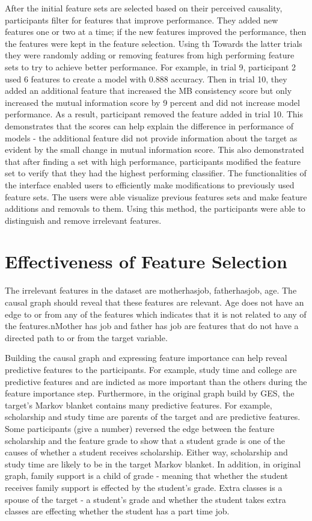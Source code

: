 After the initial feature sets are selected based on their perceived causality, participants filter for features that improve performance. They added new features one or two at a time; if the new features improved the performance, then the features were kept in the feature selection. Using th Towards the latter trials they were randomly adding or removing features from high performing feature sets to try to achieve better performance. For example, in trial 9, participant 2 used 6 features to create a model with 0.888 accuracy. Then in trial 10, they added an additional feature that increased the MB consistency score but only increased the mutual information score by 9 percent and did not increase model performance. As a result, participant removed the feature added in trial 10. This demonstrates that the scores can help explain the difference in performance of models - the additional feature did not provide information about the target as evident by the small change in mutual information score. This also demonstrated that after finding a set with high performance, participants modified the feature set to verify that they had the highest performing classifier. The functionalities of the interface enabled users to efficiently make modifications to previously used feature sets. The users were able visualize previous features sets and make feature additions and removals to them. Using this method, the participants were able to distinguish and remove irrelevant features.



\section { Effectiveness of Feature Selection }
The irrelevant features in the dataset are motherhasjob, fatherhasjob, age. The causal graph should reveal that these features are relevant. Age does not have an edge to or from any of the features which indicates that it is not related to any of the features.nMother has job and father has job are features that do not have a directed path to or from the target variable.

Building the causal graph and expressing feature importance can help reveal predictive features to the participants. For example, study time and college are predictive features and are indicted as more important than the others during the feature importance step. Furthermore, in the original graph build by GES, the target's Markov blanket contains many predictive features. For example, scholarship and study time are parents of the target and are predictive features. Some participants (give a number) reversed the edge between the feature scholarship and the feature grade to show that a student grade is one of the causes of whether a student receives scholarship. Either way, scholarship and study time are likely to be in the target Markov blanket. In addition, in original graph, family support is a child of grade - meaning that whether the student receives family support is effected by the student’s grade. Extra classes is a spouse of the target - a student’s grade and whether the student takes extra classes are effecting whether the student has a part time job.

